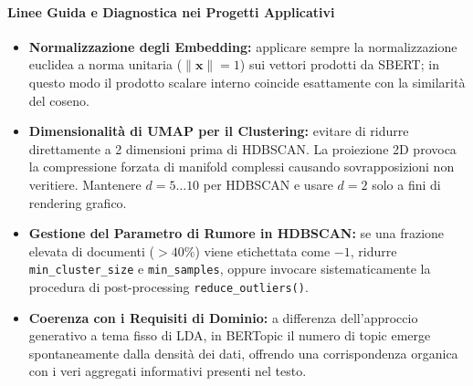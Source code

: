 \paragraph{Linee Guida e Diagnostica nei Progetti Applicativi}
\begin{itemize}
    \item \textbf{Normalizzazione degli Embedding:} applicare sempre la normalizzazione euclidea a norma unitaria ($\|\mathbf{x}\| = 1$) sui vettori prodotti da SBERT; in questo modo il prodotto scalare interno coincide esattamente con la similarità del coseno.
    \item \textbf{Dimensionalità di UMAP per il Clustering:} evitare di ridurre direttamente a 2 dimensioni prima di HDBSCAN. La proiezione 2D provoca la compressione forzata di manifold complessi causando sovrapposizioni non veritiere. Mantenere $d = 5 \dots 10$ per HDBSCAN e usare $d = 2$ solo a fini di rendering grafico.
    \item \textbf{Gestione del Parametro di Rumore in HDBSCAN:} se una frazione elevata di documenti ($> 40\%$) viene etichettata come $-1$, ridurre \texttt{min\_cluster\_size} e \texttt{min\_samples}, oppure invocare sistematicamente la procedura di post-processing \texttt{reduce\_outliers()}.
    \item \textbf{Coerenza con i Requisiti di Dominio:} a differenza dell'approccio generativo a tema fisso di LDA, in BERTopic il numero di topic emerge spontaneamente dalla densità dei dati, offrendo una corrispondenza organica con i veri aggregati informativi presenti nel testo.
\end{itemize}
